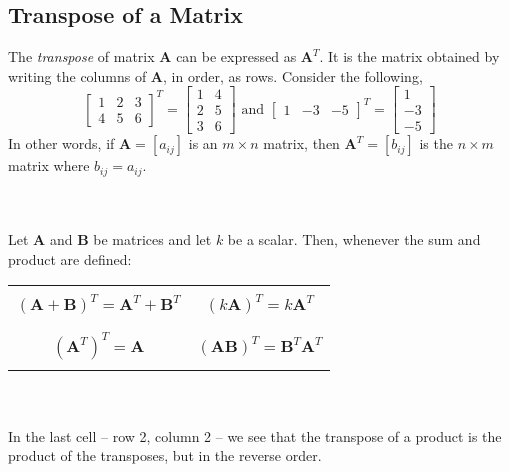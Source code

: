 \documentclass[../setup.tex]{subfiles}
\begin{document}
\subsection{Transpose of a Matrix}
The \textit{transpose} of matrix $\bm{A}$ can be expressed as $\bm{A}^T$. It is the matrix obtained by writing the columns of $\bm{A}$, in order, as rows. Consider the following, \\
\[\begin{bmatrix}1 & 2 & 3\\ 4 & 5 & 6\end{bmatrix}^{T} = \begin{bmatrix}1 & 4 \\ 2 & 5 \\ 3 & 6\end{bmatrix} \text{ and } \begin{bmatrix}1 & -3 & -5\end{bmatrix}^{T} = \begin{bmatrix}1 \\ -3 \\ -5\end{bmatrix}\]
In other words, if $\bm{A} = [a_{ij}]$ is an $m \times n$ matrix, then $\bm{A}^T = [b_{ij}]$ is the $n \times m$ matrix where $b_{ij} = a_{ij}$. \\
\phantom \\ \\
\begin{theorem}
Let $\bm{A}$ and $\bm{B}$ be matrices and let $k$ be a scalar. Then, whenever the sum and product are defined:
\begin{center}
\begin{tabular}[t]{| c | c |}
\hline
& \\
	$(\bm{A} + \bm{B})^T = \bm{A}^T + \bm{B}^T$ & $(k\bm{A})^T = k\bm{A}^T$ \\
& \\
\hline
& \\
	$(\bm{A}^T)^T = \bm{A}$ & $(\bm{AB})^T = \bm{B}^T\bm{A}^T$ \\
& \\
\hline
\end{tabular}
\end{center}
\phantom \\ \\
In the last cell -- row 2, column 2 -- we see that the transpose of a product is the product of the transposes, but in the reverse order.
\end{theorem}
\end{document}
